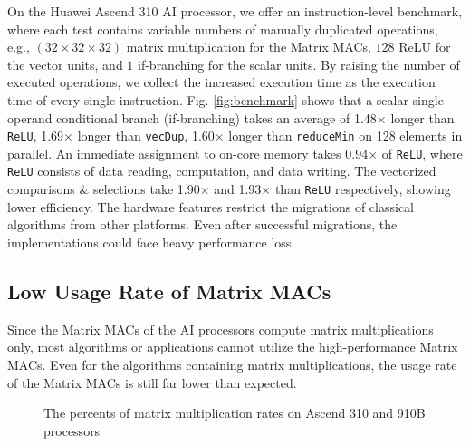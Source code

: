 \documentclass[12pt]{extbook}
\begin{document}
On the Huawei Ascend 310 AI processor, we offer an instruction-level benchmark, where each test contains variable numbers of manually duplicated operations, e.g., $(32 \times 32 \times 32)$ matrix multiplication for the Matrix MACs, $128$ ReLU for the vector units, and $1$ if-branching for the scalar units. By raising the number of executed operations, we collect the increased execution time as the execution time of every single instruction. Fig. \ref{fig:benchmark} shows that a scalar single-operand conditional branch (if-branching) takes an average of 1.48$\times$ longer than \verb|ReLU|, 1.69$\times$ longer than \verb|vecDup|, 1.60$\times$ longer than \verb|reduceMin| on 128 elements in parallel. An immediate assignment to on-core memory takes 0.94$\times$ of \verb|ReLU|, where \verb|ReLU| consists of data reading, computation, and data writing. The vectorized comparisons \& selections take 1.90$\times$ and 1.93$\times$ than \verb|ReLU| respectively, showing lower efficiency. The hardware features restrict the migrations of classical algorithms from other platforms. Even after successful migrations, the implementations could face heavy performance loss.

\subsection{Low Usage Rate of Matrix MACs}

Since the Matrix MACs of the AI processors compute matrix multiplications only, most algorithms or applications cannot utilize the high-performance Matrix MACs. Even for the algorithms containing matrix multiplications, the usage rate of the Matrix MACs is still far lower than expected.

\begin{figure}[tbp]
    \caption{The percents of matrix multiplication rates on Ascend 310 and 910B processors}
    \label{fig:back_flash}
    \end{figure}
\end{document}
